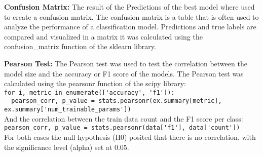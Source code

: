 \textbf{Confusion Matrix:} The result of the Predictions of the best model where used to create a confusion matrix.
The confusion matrix is a table that is often used to analyze the performance of a classification model.
Predictions and true labels are compared and visualized in a matrix it was calculated using the 
confusion\_matrix function of the sklearn library.

\textbf{Pearson Test:} The Pearson test was used to test the correlation between the model size and the accuracy
or F1 score of the models. The Pearson test was calculated using the pearsonr function of the scipy library:\\
\lstinline{for i, metric in enumerate(['accuracy', 'f1']):}\\
\lstinline{  pearson_corr, p_value = stats.pearsonr(ex.summary[metric], ex.summary['num_trainable_params'])}\\
And the correlation between the train data count and the F1 score per class:\\
\lstinline{pearson_corr, p_value = stats.pearsonr(data['f1'], data['count'])}\\
For both cases the null hypothesis (H0) posited that there is no correlation, with the significance level (alpha) set at 0.05.

